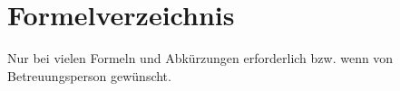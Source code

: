 \chapter*{Formelverzeichnis}

Nur bei vielen Formeln und Abkürzungen erforderlich bzw. wenn von Betreuungsperson gewünscht.

\begingroup
\let\clearpage\relax
\vspace{-2.5cm}
\listofmyequations
\endgroup
\newpage
